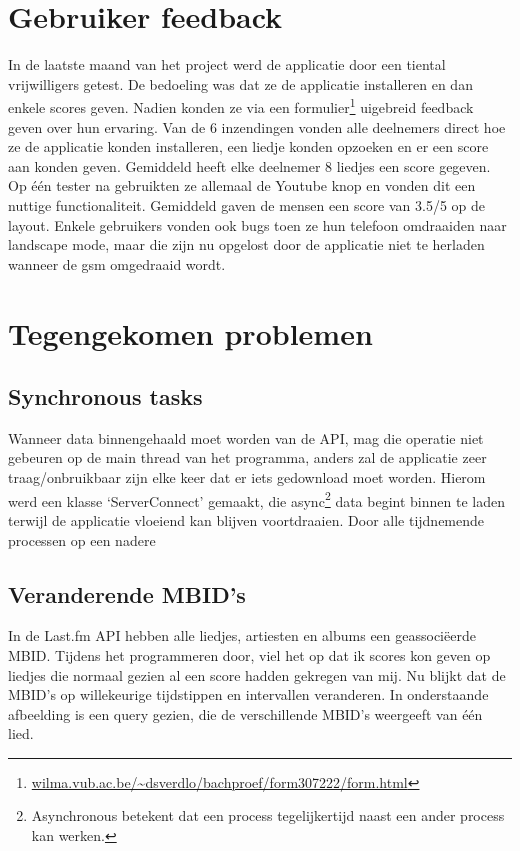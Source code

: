 \documentclass[11pt,a4paper]{article}
\begin{document}
	\newpage
\section{Gebruiker feedback}
\label{sec:feedback}

In de laatste maand van het project werd de applicatie door een tiental vrijwilligers getest. De bedoeling was dat ze de applicatie installeren en dan enkele scores geven. Nadien konden ze via een formulier\footnote{ \url{wilma.vub.ac.be/~dsverdlo/bachproef/form307222/form.html} } uigebreid feedback geven over hun ervaring. Van de 6 inzendingen vonden alle deelnemers direct hoe ze de applicatie konden installeren, een liedje konden opzoeken en er een score aan konden geven. Gemiddeld heeft elke deelnemer 8 liedjes een score gegeven. Op één tester na gebruikten ze allemaal de Youtube knop en vonden dit een nuttige functionaliteit. Gemiddeld gaven de mensen een score van 3.5/5 op de layout. Enkele gebruikers vonden ook bugs toen ze hun telefoon omdraaiden naar landscape mode, maar die zijn nu opgelost door de applicatie niet te herladen wanneer de gsm omgedraaid wordt. 

	
\section{Tegengekomen problemen}
\label{sec:Tegengekomen problemen}

	\subsection{Synchronous tasks}
	\label{sec:Synchronious tasks}
	Wanneer data binnengehaald moet worden van de API, mag die operatie niet gebeuren op de main thread van het programma, anders zal de applicatie zeer traag/onbruikbaar zijn elke keer dat er iets gedownload moet worden. Hierom werd een klasse `ServerConnect' gemaakt, die async\footnote{Asynchronous betekent dat een process tegelijkertijd naast een ander process kan werken.} data begint binnen te laden terwijl de applicatie vloeiend kan blijven voortdraaien. Door alle tijdnemende processen op een nadere
	

		
	\subsection{Veranderende MBID's}
	\label{sec:veranderendeMBID}
	In de Last.fm API hebben alle liedjes, artiesten en albums een geassociëerde MBID. Tijdens het programmeren door, viel het op dat ik scores kon geven op liedjes die normaal gezien al een score hadden gekregen van mij. Nu blijkt dat de MBID's op willekeurige tijdstippen en intervallen veranderen. In onderstaande afbeelding is een query gezien, die de verschillende MBID's weergeeft van één lied. \\
	
\end{document}
